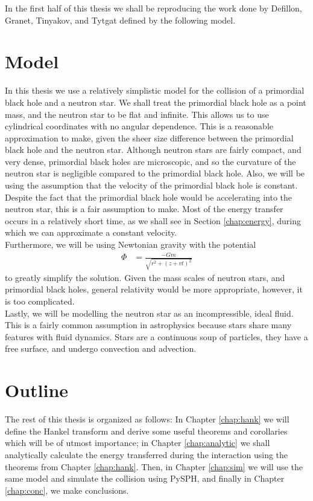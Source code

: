 In the first half of this thesis we shall be reproducing the work done by Defillon, Granet, Tinyakov, and Tytgat \cite{tidalcapture} defined by the following model.

\section{Model}

In this thesis we use a relatively simplistic model \cite{tidalcapture} for the collision of a primordial black hole and a neutron star. We shall treat the primordial black hole as a point mass, and the neutron star to be flat and infinite. This allows us to use cylindrical coordinates with no angular dependence. This is a reasonable approximation to make, given the sheer size difference between the primordial black hole and the neutron star. Although neutron stars are fairly compact, and very dense, primordial black holes are microscopic, and so the curvature of the neutron star is negligible compared to the primordial black hole. Also, we will be using the assumption that the velocity of the primordial black hole is constant. Despite the fact that the primordial black hole would be accelerating into the neutron star, this is a fair assumption to make. Most of the energy transfer occurs in a relatively short time, as we shall see in Section \ref{chap:energy}, during which we can approximate a constant velocity. \\

Furthermore, we will be using Newtonian gravity with the potential
\begin{align}
\label{eq:gravity}
\Phi &= \frac{-Gm}{\sqrt{r^2 + (z + vt)^2}}
\end{align}
to greatly simplify the solution. Given the mass scales of neutron stars, and primordial black holes, general relativity would be more appropriate, however, it is too complicated. \\

Lastly, we will be modelling the neutron star as an incompressible, ideal fluid. This is a fairly common assumption in astrophysics because stars share many features with fluid dynamics. Stars are a continuous soup of particles, they have a free surface, and undergo convection and advection.

\section{Outline}

The rest of this thesis is organized as follows: In Chapter \ref{chap:hank} we will define the Hankel transform and derive some useful theorems and corollaries which will be of utmost importance; in Chapter \ref{chap:analytic} we shall analytically calculate the energy transferred during the interaction using the theorems from Chapter \ref{chap:hank}. Then, in Chapter \ref{chap:sim} we will use the same model and simulate the collision using PySPH, and finally in Chapter \ref{chap:conc}, we make conclusions.


%
